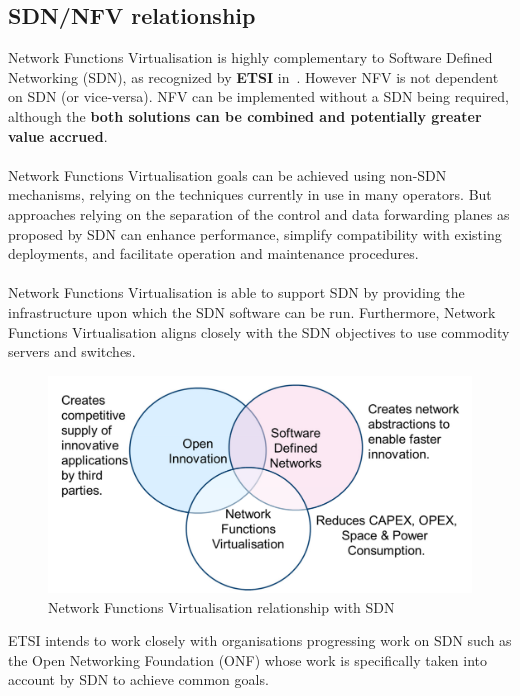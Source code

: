 \documentclass[a4paper, 12pt]{book}
\begin{document}
\subsection{SDN/NFV relationship}

Network Functions Virtualisation is highly complementary to Software Defined Networking (SDN), as recognized by \textbf{ETSI} in~\cite{ETSINFVDefinition}. However NFV is not dependent on SDN (or vice-versa). NFV can be implemented without a SDN being required, although the \textbf{both solutions can be combined and potentially greater value accrued}.\\
\\
Network Functions Virtualisation goals can be achieved using non-SDN mechanisms, relying on the techniques currently in use in many operators. But approaches relying on the separation of the control and data forwarding planes as proposed by SDN can enhance performance, simplify compatibility with existing deployments, and facilitate operation and maintenance procedures.\\
\\
Network Functions Virtualisation is able to support SDN by providing the infrastructure upon which the SDN software can be run. Furthermore, Network Functions Virtualisation aligns closely with the SDN objectives to use commodity servers and switches.

\begin{center}
 \begin{figure}[H]
 \begin{center}
   \includegraphics[width=15cm]{img/sdn-nfv-relationship-00.png}
   \caption{Network Functions Virtualisation relationship with SDN}
   \label{fig:nfv_sdn_relationship}
 \end{center}
 \end{figure}
\end{center}
ETSI intends to work closely with organisations progressing work on SDN such as the Open Networking Foundation (ONF) whose work is specifically taken into account by SDN to achieve common goals.
\end{document}
